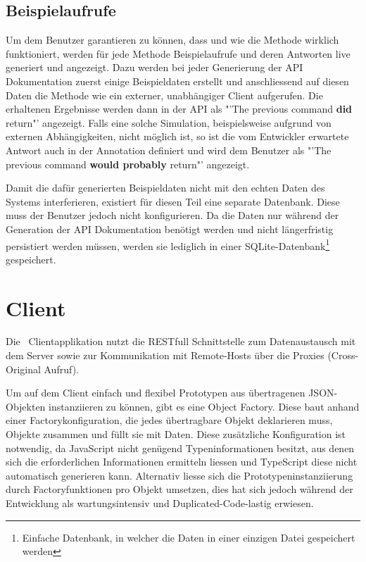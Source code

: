 	\subsection{Beispielaufrufe}
	\label{subsubsec:exampleQueries}
		Um dem Benutzer garantieren zu können, dass und wie die Methode wirklich funktioniert,
		werden für jede Methode Beispielaufrufe und deren Antworten live generiert und angezeigt.
		Dazu werden bei jeder Generierung der API Dokumentation zuerst einige Beispieldaten erstellt
		und anschliessend auf diesen Daten die Methode wie ein externer, unabhängiger Client aufgerufen.
		Die erhaltenen Ergebnisse werden dann in der API als "'The previous command \textbf{did} return"' angezeigt.
		Falls eine solche Simulation, beispielsweise aufgrund von externen Abhängigkeiten, nicht möglich ist,
		so ist die vom Entwickler erwartete Antwort auch in der Annotation definiert und wird dem Benutzer als
		"'The previous command \textbf{would probably} return"' angezeigt.
		
		Damit die dafür generierten Beispieldaten nicht mit den echten Daten des Systems interferieren,
		existiert für diesen Teil eine separate Datenbank.
		Diese muss der Benutzer jedoch nicht konfigurieren.
		Da die Daten nur während der Generation der API Dokumentation benötigt werden
		und nicht längerfristig persistiert werden müssen,
		werden sie lediglich in einer SQLite-Datenbank\footnote{Einfache Datenbank, in welcher die Daten in einer einzigen Datei gespeichert werden} gespeichert.
	


\section{Client}
		Die \eeppi\ Clientapplikation nutzt die RESTfull Schnittstelle zum Datenaustausch mit dem Server sowie zur Kommunikation mit Remote-Hosts über die Proxies (Cross-Original Aufruf).
		
		Um auf dem Client einfach und flexibel Prototypen aus übertragenen JSON-Objekten instanziieren zu können, gibt es eine Object Factory.
		Diese baut anhand einer Factorykonfiguration, die jedes übertragbare Objekt deklarieren muss, Objekte zusammen und füllt sie mit Daten.
		Diese zusätzliche Konfiguration ist notwendig, da JavaScript nicht genügend Typeninformationen besitzt, aus denen sich die erforderlichen Informationen ermitteln liessen und TypeScript diese nicht automatisch generieren kann.
		Alternativ liesse sich die Prototypeninstanziierung  durch Factoryfunktionen pro Objekt umsetzen, dies hat sich jedoch während der Entwicklung als wartungsintensiv und Duplicated-Code-lastig erwiesen.
		
